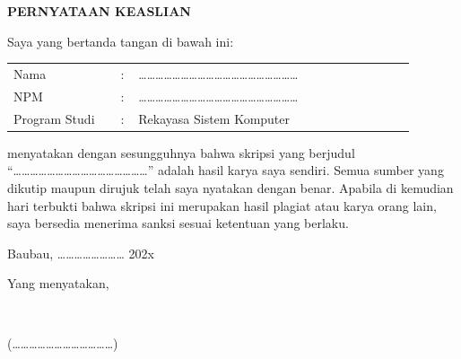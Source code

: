 \begin{halamanbaru}\end{halamanbaru}
\thispagestyle{empty}
\begin{tengah}
\textbf{PERNYATAAN KEASLIAN}
\end{tengah}
Saya yang bertanda tangan di bawah ini:

\begin{tanpagaris}
\begin{longtable}{@{}p{0.24\linewidth}p{0.04\linewidth}p{0.62\linewidth}@{}}
Nama & : & ………………………………………………… \\
NPM & : & ………………………………………………… \\
Program Studi & : & Rekayasa Sistem Komputer \\
\end{longtable}
\end{tanpagaris}

menyatakan dengan sesungguhnya bahwa skripsi yang berjudul “…………………………………………” adalah hasil karya saya sendiri. Semua sumber yang dikutip maupun dirujuk telah saya nyatakan dengan benar. Apabila di kemudian hari terbukti bahwa skripsi ini merupakan hasil plagiat atau karya orang lain, saya bersedia menerima sanksi sesuai ketentuan yang berlaku.

\begin{kanan}
Baubau, …………………… 202x

Yang menyatakan,

~

(………………………………)
\end{kanan}
\begin{akhirsampul}\end{akhirsampul}   %
